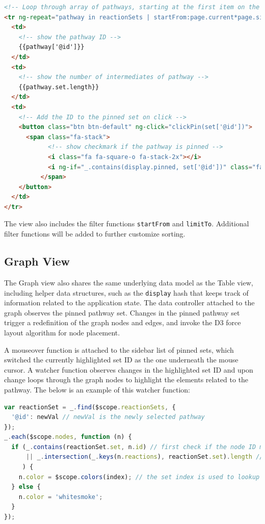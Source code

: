 \begin{lstlisting}[language=html]
<!-- Loop through array of pathways, starting at the first item on the page, stopping at the page size-->
<tr ng-repeat="pathway in reactionSets | startFrom:page.current*page.size | limitTo:page.size">
  <td>
    <!-- show the pathway ID -->
    {{pathway['@id']}}
  </td>
  <td>
    <!-- show the number of intermediates of pathway -->
    {{pathway.set.length}}
  </td>
  <td>
    <!-- Add the ID to the pinned set on click -->
    <button class="btn btn-default" ng-click="clickPin(set['@id'])">
      <span class="fa-stack">
            <!-- show checkmark if the pathway is pinned -->
            <i class="fa fa-square-o fa-stack-2x"></i>
            <i ng-if="_.contains(display.pinned, set['@id'])" class="fa fa-check fa-stack-1x"></i>
          </span>
    </button>
  </td>
</tr>
\end{lstlisting}

The view also includes the filter functions \texttt{startFrom} and \texttt{limitTo}. Additional filter functions will be added to further customize sorting.

\subsection{Graph View}
The Graph view also shares the same underlying data model as the Table view, including helper data structures, such as the \texttt{display} hash that keeps track of information related to the application state.
The data controller attached to the graph observes the pinned pathway set.
Changes in the pinned pathway set trigger a redefinition of the graph nodes and edges, and invoke the D3 force layout algorithm for node placement.

A mouseover function is attached to the sidebar list of pinned sets, which switched the currently highlighted set ID as the one underneath the mouse cursor.
A watcher function observes changes in the highlighted set ID and upon change loops through the graph nodes to highlight the elements related to the pathway.
The below is an example of this watcher function:
\begin{lstlisting}[language=JavaScript]
var reactionSet = _.find($scope.reactionSets, {
  '@id': newVal // newVal is the newly selected pathway
});
_.each($scope.nodes, function (n) {
  if (_.contains(reactionSet.set, n.id) // first check if the node ID matches the reactions listed
      || _.intersection(_.keys(n.reactions), reactionSet.set).length // each node contains a hash table with reactions that the compound is a part of
     ) {
    n.color = $scope.colors(index); // the set index is used to lookup the color value
  } else {
    n.color = 'whitesmoke';
  }
});
\end{lstlisting}


